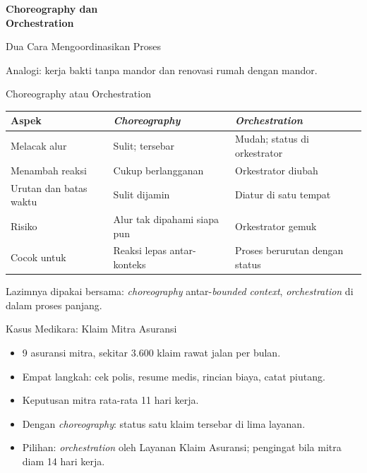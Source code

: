 \documentclass[aspectratio=169, table, 12pt]{beamer}
\begin{document}
\begin{frame}{\hfill}
  \centering
  \Huge{\textbf{Choreography dan\\Orchestration}}
\end{frame}

\begin{frame}{{\Large Dua Cara Mengoordinasikan Proses}}
  \centering

  \vspace{6pt}
  \small
  Analogi: kerja bakti tanpa mandor dan renovasi rumah dengan mandor.
\end{frame}

\begin{frame}{{\Large Choreography atau Orchestration}}
  \footnotesize
  \begin{tabularx}{\textwidth}{>{\raggedright\arraybackslash}p{3.0cm}
      >{\raggedright\arraybackslash}X >{\raggedright\arraybackslash}X}
    \hline
    \textbf{Aspek} & \textbf{\textit{Choreography}}
      & \textbf{\textit{Orchestration}} \\
    \hline
    Melacak alur & Sulit; tersebar & Mudah; status di orkestrator \\
    \hline
    Menambah reaksi & Cukup berlangganan & Orkestrator diubah \\
    \hline
    Urutan dan batas waktu & Sulit dijamin & Diatur di satu tempat \\
    \hline
    Risiko & Alur tak dipahami siapa pun & Orkestrator gemuk \\
    \hline
    Cocok untuk & Reaksi lepas antar-konteks & Proses berurutan dengan status \\
    \hline
  \end{tabularx}

  \vspace{10pt}
  \small
  Lazimnya dipakai bersama: \textit{choreography} antar-\textit{bounded
  context}, \textit{orchestration} di dalam proses panjang.
\end{frame}

\begin{frame}{{\Large Kasus Medikara: Klaim Mitra Asuransi}}
  \vspace{6pt}
  \begin{itemize}
    \item 9 asuransi mitra, sekitar 3.600 klaim rawat jalan per bulan.
    \item Empat langkah: cek polis, resume medis, rincian biaya, catat piutang.
    \item Keputusan mitra rata-rata 11 hari kerja.
    \item Dengan \textit{choreography}: status satu klaim tersebar di lima
          layanan.
    \item Pilihan: \textit{orchestration} oleh Layanan Klaim Asuransi;
          pengingat bila mitra diam 14 hari kerja.
  \end{itemize}
\end{frame}
\end{document}
